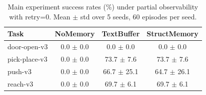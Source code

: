 \begin{table}[htbp]
\centering
\caption{Main experiment success rates (\%) under partial observability with retry=0. Mean $\pm$ std over 5 seeds, 60 episodes per seed.}
\label{tab:main_results}
\begin{tabular}{lccc}
\toprule
Task & NoMemory & TextBuffer & StructMemory \\
\midrule
door-open-v3 & 0.0 $\pm$ 0.0 & 0.0 $\pm$ 0.0 & 0.0 $\pm$ 0.0 \\
pick-place-v3 & 0.0 $\pm$ 0.0 & 73.7 $\pm$ 7.6 & 73.7 $\pm$ 7.6 \\
push-v3 & 0.0 $\pm$ 0.0 & 66.7 $\pm$ 25.1 & 64.7 $\pm$ 26.1 \\
reach-v3 & 0.0 $\pm$ 0.0 & 69.7 $\pm$ 6.1 & 69.7 $\pm$ 6.1 \\
\bottomrule
\end{tabular}
\end{table}